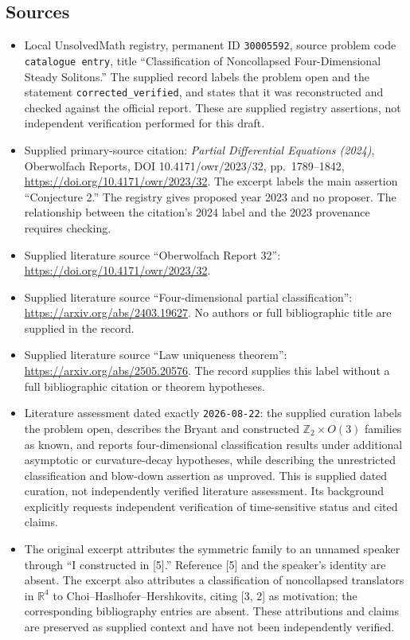 \documentclass[11pt]{article}
\newcommand{\Z}{\mathbb{Z}}
\newcommand{\R}{\mathbb{R}}
\begin{document}
\subsection{Sources}
\begin{itemize}
\item Local UnsolvedMath registry, permanent ID \texttt{30005592}, source problem code \texttt{catalogue entry}, title ``Classification of Noncollapsed Four-Dimensional Steady Solitons.'' The supplied record labels the problem open and the statement \texttt{corrected\_verified}, and states that it was reconstructed and checked against the official report. These are supplied registry assertions, not independent verification performed for this draft.
\item Supplied primary-source citation: \emph{Partial Differential Equations (2024)}, Oberwolfach Reports, DOI 10.4171/owr/2023/32, pp.\ 1789--1842, \url{https://doi.org/10.4171/owr/2023/32}. The excerpt labels the main assertion ``Conjecture 2.'' The registry gives proposed year 2023 and no proposer. The relationship between the citation's 2024 label and the 2023 provenance requires checking.
\item Supplied literature source ``Oberwolfach Report 32'': \url{https://doi.org/10.4171/owr/2023/32}.
\item Supplied literature source ``Four-dimensional partial classification'': \url{https://arxiv.org/abs/2403.19627}. No authors or full bibliographic title are supplied in the record.
\item Supplied literature source ``Law uniqueness theorem'': \url{https://arxiv.org/abs/2505.20576}. The record supplies this label without a full bibliographic citation or theorem hypotheses.
\item Literature assessment dated exactly \texttt{2026-08-22}: the supplied curation labels the problem open, describes the Bryant and constructed \(\Z_2\times O(3)\) families as known, and reports four-dimensional classification results under additional asymptotic or curvature-decay hypotheses, while describing the unrestricted classification and blow-down assertion as unproved. This is supplied dated curation, not independently verified literature assessment. Its background explicitly requests independent verification of time-sensitive status and cited claims.
\item The original excerpt attributes the symmetric family to an unnamed speaker through ``I constructed in [5].'' Reference [5] and the speaker's identity are absent. The excerpt also attributes a classification of noncollapsed translators in \(\R^4\) to Choi--Haslhofer--Hershkovits, citing [3, 2] as motivation; the corresponding bibliography entries are absent. These attributions and claims are preserved as supplied context and have not been independently verified.
\end{itemize}
\end{document}
